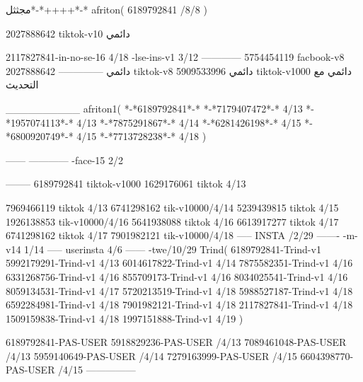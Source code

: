 مجثثل*-*++++*-*
afriton(
6189792841 /8/8
)

2027888642 tiktok-v10
دائمي

2117827841-in-no-se-16 4/18
-lse-ins-v1 3/12
------------
5754454119 facbook-v8
دائمي
--------------
2027888642 tiktok-v8
دائمي
5909533996 tiktok-v1000
دائمي مع التحديث

__________
afriton1(
*-*6189792841*-*
*-*7179407472*-* 4/13
*-*1957074113*-* 4/13
*-*7875291867*-* 4/14
*-*6281426198*-* 4/15
*-*6800920749*-* 4/15
*-*7713728238*-* 4/18
)


------
------------
-face-15 2/2

--------
6189792841 tiktok-v1000
1629176061 tiktok 4/13

7969466119 tiktok 4/13
6741298162 tik-v10000/4/14
5239439815 tiktok 4/15
1926138853 tik-v10000/4/16
5641938088 tiktok 4/16
6613917277 tiktok 4/17
6741298162 tiktok 4/17
7901982121 tik-v10000/4/18
-----
 INSTA /2/29
-------
-m-v14 1/14
-----
userinsta 4/6
------
-twe/10/29
Trind(
6189792841-Trind-v1 
5992179291-Trind-v1  4/13
6014617822-Trind-v1  4/14
7875582351-Trind-v1  4/16
6331268756-Trind-v1  4/16
855709173-Trind-v1  4/16
8034025541-Trind-v1  4/16
8059134531-Trind-v1  4/17
5720213519-Trind-v1  4/18
5988527187-Trind-v1  4/18
6592284981-Trind-v1  4/18
7901982121-Trind-v1  4/18
2117827841-Trind-v1  4/18
1509159838-Trind-v1  4/18
1997151888-Trind-v1  4/19
)

6189792841-PAS-USER
5918829236-PAS-USER /4/13
7089461048-PAS-USER /4/13
5959140649-PAS-USER /4/14
7279163999-PAS-USER /4/15
6604398770-PAS-USER /4/15
    ---------------
